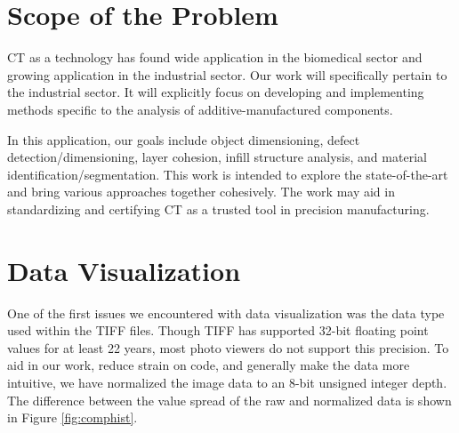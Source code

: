 \documentclass[11pt, letterpaper, notitlepage]{article}
\begin{document}
\begin{multicols}{2}
\section{Scope of the Problem}
% 

CT as a technology has found wide application in the biomedical sector and growing application in the industrial sector. Our work will specifically pertain to the industrial sector. It will explicitly focus on developing and implementing methods specific to the analysis of additive-manufactured components. 

In this application, our goals include object dimensioning, defect detection/dimensioning, layer cohesion, infill structure analysis, and material identification/segmentation. This work is intended to explore the state-of-the-art and bring various approaches together cohesively. The work may aid in standardizing and certifying CT as a trusted tool in precision manufacturing.

\section{Data Visualization}
One of the first issues we encountered with data visualization was the data type used within the TIFF files. Though TIFF has supported 32-bit floating point values for at least 22 years, most photo viewers do not support this precision. To aid in our work, reduce strain on code, and generally make the data more intuitive, we have normalized the image data to an 8-bit unsigned integer depth. The difference between the value spread of the raw and normalized data is shown in Figure \ref{fig:comphist}.


\end{multicols}
\end{document}
